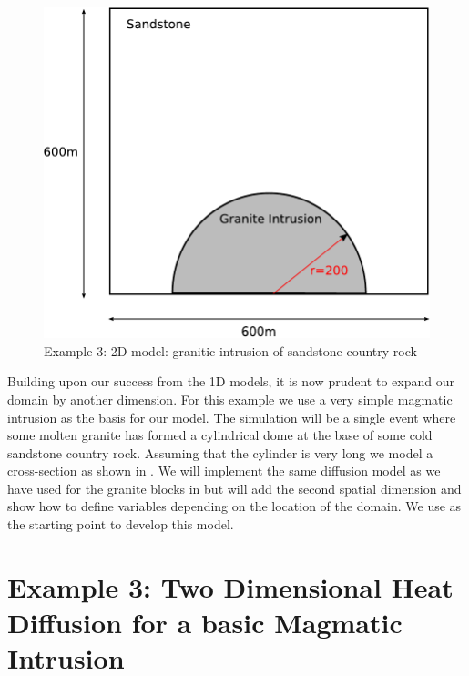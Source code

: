 
%
%
%

\begin{figure}[t]
\centerline{\includegraphics[width=4.in]{figures/twodheatdiff}}
\caption{Example 3: 2D model: granitic intrusion of sandstone country rock}
\label{fig:twodhdmodel}
\end{figure}


Building upon our success from the 1D models, it is now prudent to expand our
domain by another dimension. 
For this example we use a very simple magmatic intrusion as the basis for our
model. The simulation will be a single event where some molten granite has
formed a cylindrical dome at the base of some cold sandstone country rock.
Assuming that the cylinder is very long
we model a cross-section as shown in . We will implement
the same 
diffusion model as we have used for the granite blocks in 
but will add the second spatial dimension and show how to define 
variables depending on the location of the domain. 
We use  as the starting point to develop this model. 

\section{Example 3: Two Dimensional Heat Diffusion for a basic Magmatic
Intrusion}
\label{Sec:2DHD}

